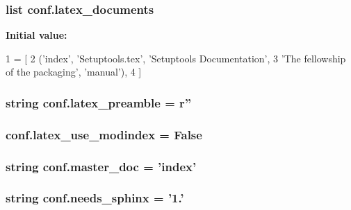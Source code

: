 \subsubsection[{latex\+\_\+documents}]{\setlength{\rightskip}{0pt plus 5cm}list conf.\+latex\+\_\+documents}\label{namespaceconf_a00b7896473527f894006130b1113cb4b}
{\bfseries Initial value\+:}
\begin{DoxyCode}
1 = [
2   (\textcolor{stringliteral}{'index'}, \textcolor{stringliteral}{'Setuptools.tex'}, \textcolor{stringliteral}{'Setuptools Documentation'},
3    \textcolor{stringliteral}{'The fellowship of the packaging'}, \textcolor{stringliteral}{'manual'}),
4 ]
\end{DoxyCode}
\hypertarget{namespaceconf_a71183e61f5009895b3ffe041296e6af9}{}
\subsubsection[{latex\+\_\+preamble}]{\setlength{\rightskip}{0pt plus 5cm}string conf.\+latex\+\_\+preamble = {\bf r}''}\label{namespaceconf_a71183e61f5009895b3ffe041296e6af9}
\hypertarget{namespaceconf_acaffe3a51cfe6aaebb3becbb1306a675}{}
\subsubsection[{latex\+\_\+use\+\_\+modindex}]{\setlength{\rightskip}{0pt plus 5cm}conf.\+latex\+\_\+use\+\_\+modindex = {\bf False}}\label{namespaceconf_acaffe3a51cfe6aaebb3becbb1306a675}
\hypertarget{namespaceconf_ae22a29d94a222730836db739d6dbd71e}{}
\subsubsection[{master\+\_\+doc}]{\setlength{\rightskip}{0pt plus 5cm}string conf.\+master\+\_\+doc = 'index'}\label{namespaceconf_ae22a29d94a222730836db739d6dbd71e}
\hypertarget{namespaceconf_a1bd7b8b2b5162016a408465167765e68}{}
\subsubsection[{needs\+\_\+sphinx}]{\setlength{\rightskip}{0pt plus 5cm}string conf.\+needs\+\_\+sphinx = '1.'}\label{namespaceconf_a1bd7b8b2b5162016a408465167765e68}
\hypertarget{namespaceconf_a0b60d28b58b5b39a56f566734dec27bb}{}
